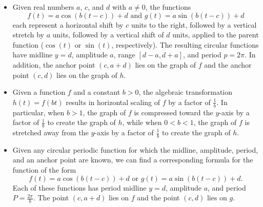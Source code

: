 \documentclass{ximera}
\begin{document}
%
%
%

\begin{summary}
\begin{itemize}[label=\textbullet]
\item
Given real numbers \(a\), \(c\), and \(d\) with \(a \ne 0\), the functions%
\begin{equation*}
f(t) = a\cos(b(t-c))+d \text{ and } g(t) = a\sin(b(t-c)) + d
\end{equation*}
each represent a horizontal shift by \(c\) units to the right, followed by a vertical stretch by \(a\) units, followed by a vertical shift of \(d\) units, applied to the parent function (\(\cos(t)\) or \(\sin(t)\), respectively).  The resulting circular functions have midline \(y = d\), amplitude \(a\), range \([d-a,d+a]\), and period \(p = 2\pi\).  In addition, the anchor point \((c,a+d)\) lies on the graph of \(f\) and the anchor point \((c,d)\) lies on the graph of \(h\).%
\item
Given a function \(f\) and a constant \(b \gt 0\), the algebraic transformation \(h(t) = f(bt)\) results in horizontal scaling of \(f\) by a factor of \(\frac{1}{b}\).  In particular, when \(b \gt 1\), the graph of \(f\) is compressed toward the \(y\)-axis by a factor of \(\frac{1}{b}\) to create the graph of \(h\), while when \(0 \lt b \lt 1\), the graph of \(f\) is stretched away from the \(y\)-axis by a factor of \(\frac{1}{b}\) to create the graph of \(h\).%
\item
Given any circular periodic function for which the midline, amplitude, period, and an anchor point are known, we can find a corresponding formula for the function of the form%
\begin{equation*}
f(t) = a\cos(b(t-c))+d \text{ or } g(t) = a\sin(b(t-c)) + d\text{.}
\end{equation*}
Each of these functions has period midline \(y = d\), amplitude \(a\), and period \(P = \frac{2\pi}{b}\).  The point \((c,a+d)\) lies on \(f\) and the point \((c,d)\) lies on \(g\).%
\end{itemize}
\end{summary}
%
%
\end{document}
